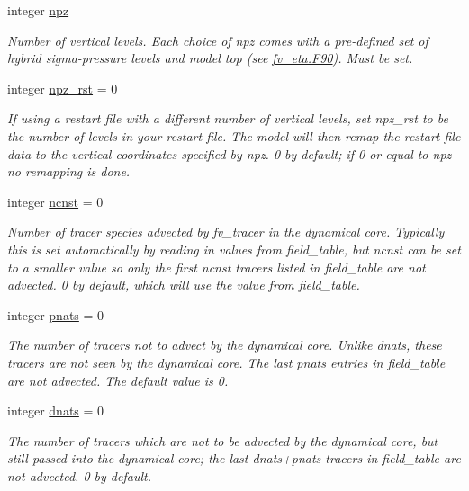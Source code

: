 \begin{DoxyCompactItemize}
integer \hyperlink{structfv__arrays__mod_1_1fv__flags__type_a7cb0e06006a898845d3a6b1d92c7def6}{npz}
\begin{DoxyCompactList}\small\item\em Number of vertical levels. Each choice of npz comes with a pre-\/defined set of hybrid sigma-\/pressure levels and model top (see \hyperlink{fv__eta_8F90}{fv\-\_\-eta.\-F90}). Must be set. \end{DoxyCompactList}\item 
integer \hyperlink{structfv__arrays__mod_1_1fv__flags__type_a49de58ed8a38556bb4fe86c5601a4f64}{npz\-\_\-rst} = 0
\begin{DoxyCompactList}\small\item\em If using a restart file with a different number of vertical levels, set npz\-\_\-rst to be the number of levels in your restart file. The model will then remap the restart file data to the vertical coordinates specified by npz. 0 by default; if 0 or equal to npz no remapping is done. \end{DoxyCompactList}\item 
integer \hyperlink{structfv__arrays__mod_1_1fv__flags__type_a24a73d24233252ae1710d6492b95889e}{ncnst} = 0
\begin{DoxyCompactList}\small\item\em Number of tracer species advected by fv\-\_\-tracer in the dynamical core. Typically this is set automatically by reading in values from field\-\_\-table, but ncnst can be set to a smaller value so only the first ncnst tracers listed in field\-\_\-table are not advected. 0 by default, which will use the value from field\-\_\-table. \end{DoxyCompactList}\item 
integer \hyperlink{structfv__arrays__mod_1_1fv__flags__type_ad9ce795f3fc8ee6d20219c029179f132}{pnats} = 0
\begin{DoxyCompactList}\small\item\em The number of tracers not to advect by the dynamical core. Unlike dnats, these tracers are not seen by the dynamical core. The last pnats entries in field\-\_\-table are not advected. The default value is 0. \end{DoxyCompactList}\item 
integer \hyperlink{structfv__arrays__mod_1_1fv__flags__type_a3c8880ee23bd497bb848ee8627a986cd}{dnats} = 0
\begin{DoxyCompactList}\small\item\em The number of tracers which are not to be advected by the dynamical core, but still passed into the dynamical core; the last dnats+pnats tracers in field\-\_\-table are not advected. 0 by default. \end{DoxyCompactList}\item 

\end{DoxyCompactItemize}
